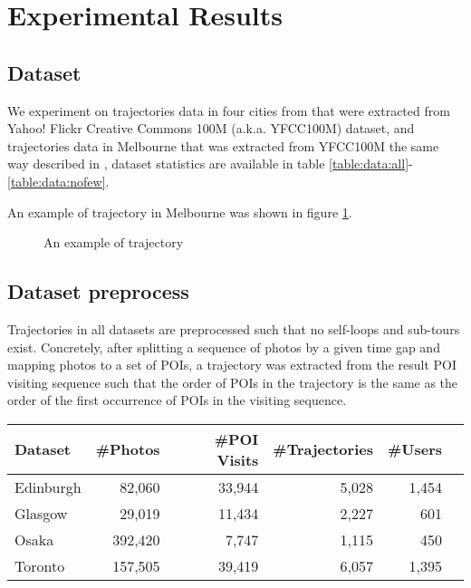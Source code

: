 \section{Experimental Results}
\label{experiment}

\subsection{Dataset}
\label{experiment:dataset}
We experiment on trajectories data in four cities from \cite{ijcai15} that were
extracted from Yahoo! Flickr Creative Commons 100M (a.k.a. YFCC100M) dataset\cite{yfcc100m},
and trajectories data in Melbourne that was extracted from YFCC100M the same way described in \cite{ht10, ijcai15},
dataset statistics are available in table \ref{table:data:all}-\ref{table:data:nofew}.

An example of trajectory in Melbourne was shown in figure \ref{fig:traj}.

\begin{figure}
\centering
{}
\caption{An example of trajectory}
\label{fig:traj}
\end{figure}

\subsection{Dataset preprocess}
\label{experiment:datapreprocess}
Trajectories in all datasets are preprocessed such that no self-loops and sub-tours exist.
Concretely, after splitting a sequence of photos by a given time gap and mapping photos to a set of POIs\cite{ht10, ijcai15},
a trajectory was extracted from the result POI visiting sequence such that the order of POIs in the trajectory is the same as 
the order of the first occurrence of POIs in the visiting sequence.


\begin{table*}
\centering
\caption{Datasets description}
\label{table:data:all}
\begin{tabular}{lrrrrr} \hline
\textbf{Dataset} & \textbf{\#Photos} & \textbf{\#POI Visits} & \textbf{\#Trajectories} & \textbf{\#Users} \\ \hline
Edinburgh & 82,060 & 33,944 & 5,028 & 1,454 \\ 
Glasgow & 29,019 & 11,434 & 2,227 & 601 \\ 
Osaka & 392,420 & 7,747 & 1,115 & 450 \\ 
Toronto & 157,505 & 39,419 & 6,057 & 1,395 \\ 
\hline
\end{tabular}
\end{table*}



